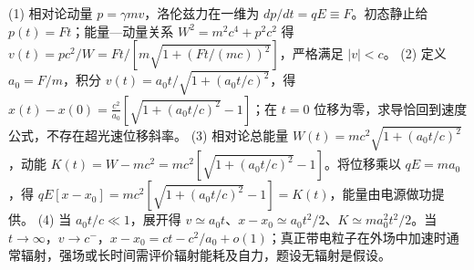 (1) 相对论动量 \(p=\gamma mv\)，洛伦兹力在一维为 \(dp/dt=qE\equiv F\)。初态静止给 \(p(t)=Ft\)；能量—动量关系 \(W^2=m^2c^4+p^2c^2\) 得 \(v(t)=pc^2/W=Ft/[m\sqrt{1+(Ft/(mc))^2}]\)，严格满足 \(|v|<c\)。
(2) 定义 \(a_0=F/m\)，积分 \(v(t)=a_0t/\sqrt{1+(a_0t/c)^2}\)，得 \(x(t)-x(0)=\frac{c^2}{a_0}[\sqrt{1+(a_0t/c)^2}-1]\)；在 \(t=0\) 位移为零，求导恰回到速度公式，不存在超光速位移斜率。
(3) 相对论总能量 \(W(t)=mc^2\sqrt{1+(a_0t/c)^2}\)，动能 \(K(t)=W-mc^2=mc^2[\sqrt{1+(a_0t/c)^2}-1]\)。将位移乘以 \(qE=ma_0\)，得 \(qE[x-x_0]=mc^2[\sqrt{1+(a_0t/c)^2}-1]=K(t)\)，能量由电源做功提供。
(4) 当 \(a_0t/c\ll1\)，展开得 \(v\simeq a_0t\)、\(x-x_0\simeq a_0t^2/2\)、\(K\simeq ma_0^2t^2/2\)。当 \(t\to\infty\)，\(v\to c^-\)，\(x-x_0=ct-c^2/a_0+o(1)\)；真正带电粒子在外场中加速时通常辐射，强场或长时间需评价辐射能耗及自力，题设无辐射是假设。
